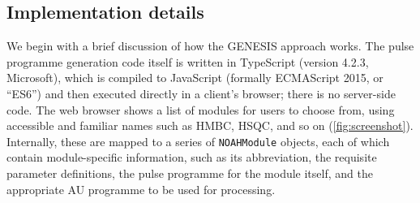 \documentclass[a4paper,11pt]{article}
\begin{document}
\begin{refsection}
\section{Implementation details}

We begin with a brief discussion of how the GENESIS approach works.
The pulse programme generation code itself is written in TypeScript (version 4.2.3, Microsoft), which is compiled to JavaScript (formally ECMAScript 2015, or ``ES6'') and then executed directly in a client's browser; there is no server-side code.
The web browser shows a list of modules for users to choose from, using accessible and familiar names such as HMBC, HSQC, and so on (\cref{fig:screenshot}).
Internally, these are mapped to a series of \texttt{NOAHModule} objects, each of which contain module-specific information, such as its abbreviation, the requisite parameter definitions, the pulse programme for the module itself, and the appropriate AU programme to be used for processing. 


\end{refsection}
\end{document}
